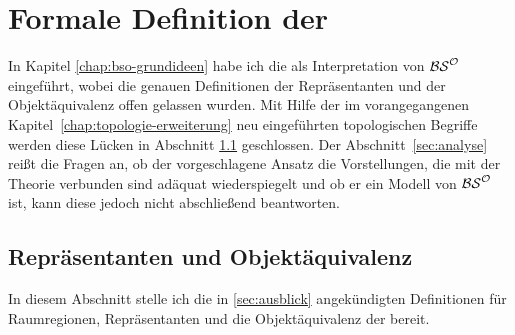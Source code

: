 \chapter{Formale Definition der \strukt}\label{chap:bso-struktur}
    In Kapitel \ref{chap:bso-grundideen} habe ich die \strukt als Interpretation von $\mathcal{BS}^{\mathcal{O}}$ eingeführt, wobei die genauen Definitionen der Repräsentanten und der Objektäquivalenz offen gelassen wurden. 
    Mit Hilfe der im vorangegangenen Kapitel~\ref{chap:topologie-erweiterung} neu eingeführten topologischen Begriffe werden diese Lücken in Abschnitt \ref{sec:univ-2} geschlossen.
    Der Abschnitt~\ref{sec:analyse} reißt die Fragen an, ob der vorgeschlagene Ansatz die Vorstellungen, die mit der Theorie verbunden sind adäquat wiederspiegelt und ob er ein Modell von $\mathcal{BS}^{\mathcal{O}}$ ist, kann diese jedoch nicht abschließend beantworten.
% 


    \section{Repräsentanten und Objektäquivalenz}\label{sec:univ-2}
    In diesem Abschnitt stelle ich die in \ref{sec:ausblick} angekündigten Definitionen für Raumregionen, Repräsentanten und die Objektäquivalenz der \strukt bereit.
    
%     

